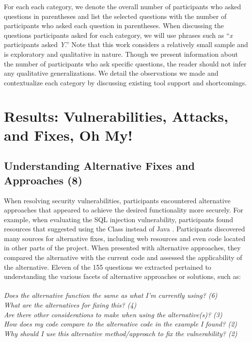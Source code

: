 \documentclass[conference]{IEEEtran}
\begin{document}
For each each category, we denote the overall number of participants who asked questions in parentheses and list the selected questions with the number of participants who asked each question in parentheses. 
When discussing the questions participants asked for each category, we will use phrases such as ``\emph{x} participants asked \emph{Y}.''
Note that this work considers a relatively small sample and is exploratory and qualitative in nature.
Though we present information about the number of participants who ask specific questions, the reader should not infer any qualitative generalizations.
We detail the observations we made and contextualize each category by discussing existing tool support and shortcomings.

\section{Results: Vulnerabilities, Attacks, and Fixes, Oh My!}
\label{sec:results-vaf}



\noindent\subsection{\textbf{Understanding Alternative Fixes and Approaches (8)}}\label{uafa}

When resolving security vulnerabilities, participants encountered alternative approaches that appeared to achieve the desired functionality more securely.
For example, when evaluating the SQL injection vulnerability, participants found resources that suggested using the  Class instead of Java . 
Participants discovered many sources for alternative fixes, including web resources and even code located in other parts of the project.
When presented with alternative approaches, they compared the alternative with the current code and assessed the applicability of the alternative. 
Eleven of the 155 questions we extracted pertained to understanding the various facets of alternative approaches or solutions, such as:
\\
\\
\noindent\emph{Does the alternative function the same as what I'm currently using? (6)} \\
\emph{What are the alternatives for fixing this? (4)} \\
\emph{Are there other considerations to make when using the alternative(s)? (3)} \\
\emph{How does my code compare to the alternative code in the example I found? (2)} \\
\emph{Why should I use this alternative method/approach to fix the vulnerability? (2)} \\
\end{document}
